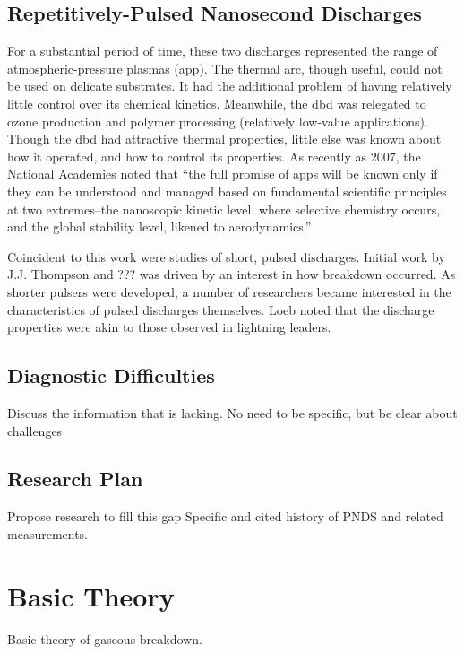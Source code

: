 \subsection{Repetitively-Pulsed Nanosecond Discharges}


For a substantial period of time, these two  discharges
represented the range of atmospheric-pressure plasmas (\acs{app}). The thermal
arc, though useful, could not be used on delicate substrates. It had the
additional problem of having relatively little control over its chemical
kinetics. Meanwhile, the \acs{dbd} was relegated to ozone production and polymer
processing (relatively low-value applications). Though the \acs{dbd} had
attractive thermal properties, little else was known about how it operated, and
how to control its properties. As recently as $2007$, the National Academies
noted that ``the full promise of \acs{app}s will be known only if they can be
understood and managed based on fundamental scientific principles at two
extremes--the nanoscopic kinetic level, where selective chemistry occurs, and
the global stability level, likened to aerodynamics.''

Coincident to this work were studies of short, pulsed discharges. Initial work
by J.J. Thompson and ???  was driven by an interest in
how breakdown occurred. As shorter pulsers were developed, a number of
researchers became interested in the characteristics of pulsed discharges
themselves. Loeb  noted that the discharge properties were akin
to those observed in lightning leaders. 


\subsection{Diagnostic Difficulties}

Discuss the information that is lacking. No need to be specific, but be clear
about challenges

\subsection{Research Plan}

Propose research to fill this gap
Specific and cited history of PNDS and related measurements.

\section{Basic Theory}

Basic theory of gaseous breakdown.
